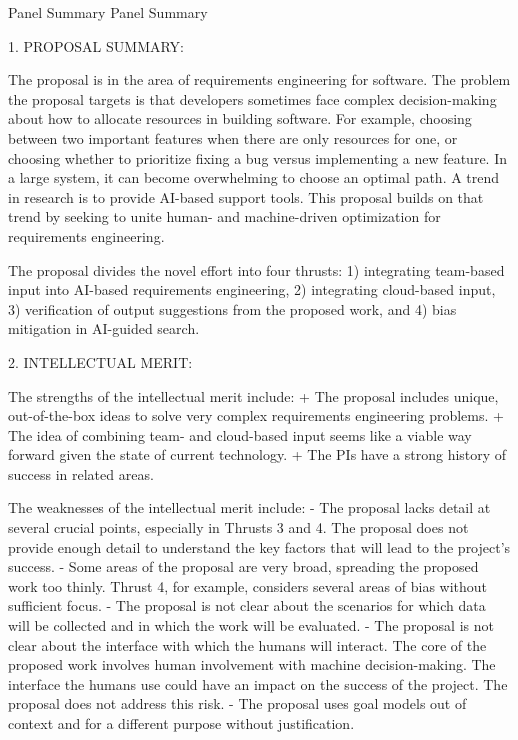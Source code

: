 Panel Summary
Panel Summary

1. PROPOSAL SUMMARY:


The proposal is in the area of requirements engineering for software. The problem the proposal targets is that developers sometimes face complex decision-making about how to allocate resources in building software. For example, choosing between two important features when there are only resources for one, or choosing whether to prioritize fixing a bug versus implementing a new feature. In a large system, it can become overwhelming to choose an optimal path. A trend in research is to provide AI-based support tools. This proposal builds on that trend by seeking to unite human- and machine-driven optimization for requirements engineering.

The proposal divides the novel effort into four thrusts: 1) integrating team-based input into AI-based requirements engineering, 2) integrating cloud-based input, 3) verification of output suggestions from the proposed work, and 4) bias mitigation in AI-guided search.

2. INTELLECTUAL MERIT:



The strengths of the intellectual merit include:
+ The proposal includes unique, out-of-the-box ideas to solve very complex requirements engineering problems.
+ The idea of combining team- and cloud-based input seems like a viable way forward given the state of current technology.
+ The PIs have a strong history of success in related areas.

The weaknesses of the intellectual merit include:
- The proposal lacks detail at several crucial points, especially in Thrusts 3 and 4. The proposal does not provide enough detail to understand the key factors that will lead to the project’s success.
- Some areas of the proposal are very broad, spreading the proposed work too thinly. Thrust 4, for example, considers several areas of bias without sufficient focus.
- The proposal is not clear about the scenarios for which data will be collected and in which the work will be evaluated.
- The proposal is not clear about the interface with which the humans will interact. The core of the proposed work involves human involvement with machine decision-making. The interface the humans use could have an impact on the success of the project. The proposal does not address this risk.
- The proposal uses goal models out of context and for a different purpose without justification.



